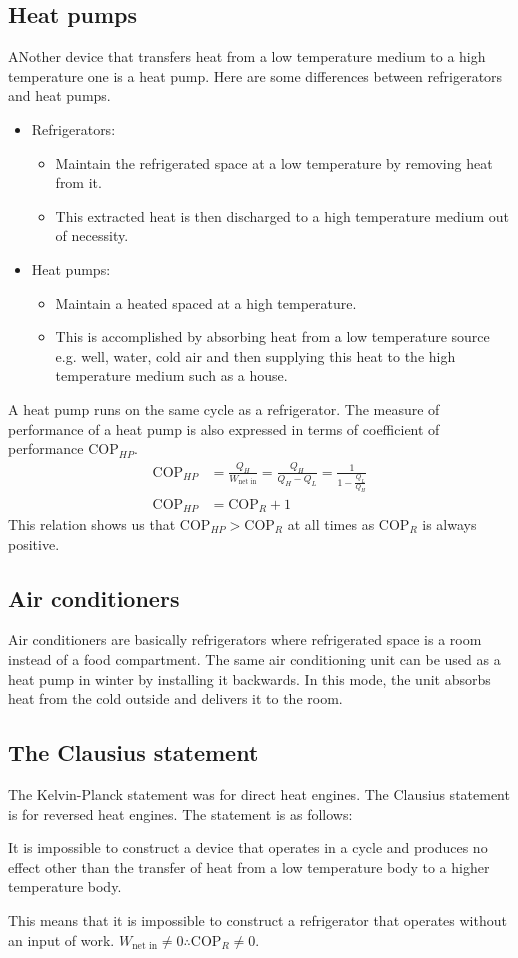 \documentclass[class=report, crop=false, 12pt,a4paper]{standalone}
\begin{document}
\subsection{Heat pumps}
ANother device that transfers heat from a low temperature medium to a high temperature one is a heat pump. 
Here are some differences between refrigerators and heat pumps.
\begin{itemize}[noitemsep]
  \item Refrigerators:
  \begin{itemize}
    \item Maintain the refrigerated space at a low temperature by removing heat from it.
    \item This extracted heat is then discharged to a high temperature medium out of necessity.
  \end{itemize}
  \item Heat pumps:
  \begin{itemize}
    \item Maintain a heated spaced at a high temperature.
    \item This is accomplished by absorbing heat from a low temperature source e.g. well, water, cold air and then supplying this heat to the high temperature medium such as a house.
  \end{itemize}
\end{itemize}
A heat pump runs on the same cycle as a refrigerator. The measure of performance of a heat pump is also expressed in terms of coefficient of performance \(\textrm{COP}_{HP}\).
\begin{align}
  \textrm{COP}_{HP} &= \frac{Q_H}{W_{\textrm{net in}}} = \frac{Q_H}{Q_H - Q_L} = \frac{1}{1 - \frac{Q_L}{Q_H}} \\
  \textrm{COP}_{HP} &= \textrm{COP}_R + 1 
\end{align}
This relation shows us that $\textrm{COP}_{HP} > \textrm{COP}_R$ at all times as $\textrm{COP}_R$ is always positive.
\subsection{Air conditioners}
Air conditioners are basically refrigerators where refrigerated space is a room instead of a food compartment. The same air conditioning unit can be used as a heat pump in winter by installing it backwards. In this mode, the unit absorbs heat from the cold outside and delivers it to the room.
\subsection{The Clausius statement}
The Kelvin-Planck statement was for direct heat engines. The Clausius statement is for reversed heat engines. The statement is as follows:
\begin{center}
  It is impossible to construct a device that operates in a cycle and produces no effect other than the transfer of heat from a low temperature body to a higher temperature body.
\end{center}
This means that it is impossible to construct a refrigerator that operates without an input of work. \(W_{\textrm{net in}} \neq 0 \therefore \textrm{COP}_R \neq 0\).
\end{document}
